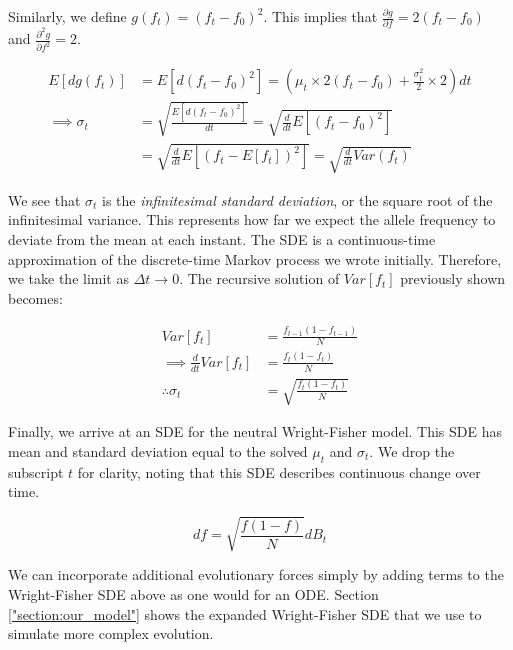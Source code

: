 Similarly, we define $g(f_t) = (f_t - f_0)^2$. This implies that $\frac {\partial g}{\partial f} = 2(f_t - f_0)$ and $\frac{\partial^2 g}{\partial f^2} = 2$.


\begin{equation}
    \begin{split}
         E[dg(f_t)] &= E[d(f_t-f_0)^2] = (\mu_t \times 2(f_t - f_0) + \frac{\sigma_t^2}{2} \times 2)dt \\
         \implies \sigma_t &= \sqrt{\frac{E[d(f_t-f_0)^2]}{dt}} = \sqrt{\frac{d}{dt}E[(f_t-f_0)^2]} \\
         &= \sqrt{\frac{d}{dt}E[(f_t-E[f_t])^2]} = \sqrt{\frac{d}{dt}Var(f_t)}
    \end{split}
\end{equation}


We see that $\sigma_t$ is the \textit{infinitesimal standard deviation}, or the square root of the infinitesimal variance. This represents how far we expect the allele frequency to deviate from the mean at each instant. The SDE is a continuous-time approximation of the discrete-time Markov process we wrote initially. Therefore, we take the limit as $\Delta t \to 0$. The recursive solution of $Var[f_t]$ previously shown becomes:


\begin{equation}
    \begin{split}
         Var[f_t] &= \frac{f_{t-1}(1-f_{t-1})}{N} \\
         \implies \frac{d}{dt} Var[f_t] &= \frac{f_t(1-f_t)}{N} \\
         \therefore \sigma_t &= \sqrt{\frac{f_t(1-f_t)}{N}}
    \end{split}
\end{equation}

Finally, we arrive at an SDE for the neutral Wright-Fisher model. This SDE has mean and standard deviation equal to the solved $\mu_t$ and $\sigma_t$. We drop the subscript $t$ for clarity, noting that this SDE describes continuous change over time. 

\begin{equation}
    df = \sqrt{\frac{f(1-f)}{N}} dB_t
\end{equation}


We can incorporate additional evolutionary forces simply by adding terms to the Wright-Fisher SDE above as one would for an ODE. Section \ref{"section:our_model"} shows the expanded Wright-Fisher SDE that we use to simulate more complex evolution. 


